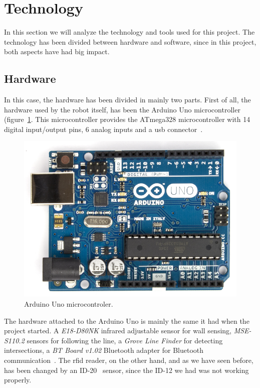 \section{Technology}

In this section we will analyze the technology and tools used for this project. The technology has
been divided between hardware and software, since in this project, both aspects have had big impact.

\subsection{Hardware}

In this case, the hardware has been divided in mainly two parts. First of all, the hardware used by
the robot itself, has been the Arduino Uno microcontroller (figure~\ref{fig:arduino_board}. This
microcontroller provides the ATmega328 microcontroller with 14 digital input/output pins, 6 analog
inputs and a \acrshort{usb} connector~\cite{arduino_datasheet}.

\begin{figure}[!htbp]
	\centering
	\includegraphics[height=0.3\textheight]{fig/arduino-board}
	\caption{Arduino Uno microcontroler.}
	\label{fig:arduino_board}
\end{figure}

The hardware attached to the Arduino Uno is mainly the same it had when the project started. A
\emph{E18-D80NK} infrared adjustable sensor for wall sensing, \emph{MSE-S110.2} sensors for
following the line, a \emph{Grove Line Finder} for detecting intersections, a
\emph{BT Board v1.02} Bluetooth adapter for Bluetooth communication~\cite{fdp_itu}. The
\acrshort{rfid} reader, on the other hand, and as we have seen before, has been changed by an
ID-20~\cite{rfid} sensor, since the ID-12 we had was not working properly.

